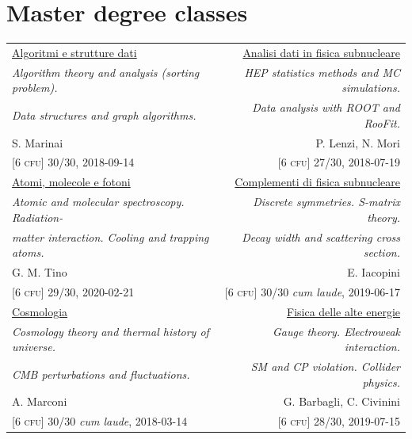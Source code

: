 \documentclass[a4, 11pt]{report}
\begin{document}
    \section*{Master degree classes}
        \begin{tabular*}{\textwidth}{l @{\extracolsep{\fill}} r}
            {\ul {Algoritmi e strutture dati}} & {\ul {Analisi dati in fisica subnucleare}}\\
            {\small \emph {Algorithm theory and analysis (sorting problem).}} & {\small \emph {HEP statistics methods and MC simulations.}}\\
            {\small \emph {Data structures and graph algorithms.}} & {\small \emph {Data analysis with ROOT and RooFit.}}\\
            {\small S. Marinai} & {\small P. Lenzi, N. Mori}\\
            {\small [6 \textsc{cfu}] 30/30, 2018-09-14} & {\small [6 \textsc{cfu}] 27/30, 2018-07-19}\\ [3mm]

            {\ul {Atomi, molecole e fotoni}} & {\ul {Complementi di fisica subnucleare}}\\
            {\small \emph {Atomic and molecular spectroscopy. Radiation-}} & {\small \emph {Discrete symmetries. S-matrix theory.}}\\
            {\small \emph {matter interaction. Cooling and trapping atoms.}} & {\small \emph {Decay width and scattering cross section.}}\\
            {\small G. M. Tino} & {\small E. Iacopini}\\
            {\small [6 \textsc{cfu}] 29/30, 2020-02-21} & {\small [6 \textsc{cfu}] 30/30 \textit{cum laude}, 2019-06-17}\\ [3mm]

            {\ul {Cosmologia}} & {\ul {Fisica delle alte energie}}\\
            {\small \emph {Cosmology theory and thermal history of universe.}} & {\small \emph {Gauge theory. Electroweak interaction.}}\\
            {\small \emph {CMB perturbations and fluctuations.}} & {\small \emph {SM and CP violation. Collider physics.}}\\
            {\small A. Marconi} & {\small G. Barbagli, C. Civinini}\\
            {\small [6 \textsc{cfu}] 30/30 \textit{cum laude}, 2018-03-14} & {\small [6 \textsc{cfu}] 28/30, 2019-07-15}\\ [3mm]


\end{tabular*}
\end{document}

